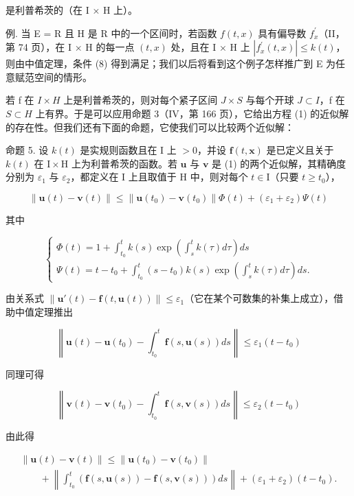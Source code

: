 是利普希茨的（在 I × H 上）。

例. 当 E = R 且 H 是 R 中的一个区间时，若函数 \(f(t, x)\) 具有偏导数 \(f_{x}^{\prime}\)（II，第 74 页），在 I × H 的每一点 \((t, x)\) 处，且在 I × H 上 \(|f_{x}^{\prime}(t, x)| \leqslant k(t)\)，则由中值定理，条件 (8) 得到满足；我们以后将看到这个例子怎样推广到 E 为任意赋范空间的情形。

若 f 在 \(I \times H\) 上是利普希茨的，则对每个紧子区间 \(J \times S\) 与每个开球 \(J \subset I\)，f 在 \(S \subset H\) 上有界。于是可以应用命题 3（IV，第 166 页），它给出方程 (1) 的近似解的存在性。但我们还有下面的命题，它使我们可以比较两个近似解：

命题 5. 设 \(k(t)\) 是实规则函数且在 I 上 \(>0\)，并设 \(\mathbf{f}(t, \mathbf{x})\) 是已定义且关于 \(k(t)\) 在 \(\mathrm{I} \times \mathrm{H}\) 上为利普希茨的函数。若 \(\mathbf{u}\) 与 \(\mathbf{v}\) 是 (1) 的两个近似解，其精确度分别为 \(\varepsilon_1\) 与 \(\varepsilon_2\)，都定义在 I 上且取值于 H 中，则对每个 \(t \in \mathrm{I}\)（只要 \(t \geqslant t_0\)），

\[
\left\| \mathbf {u} (t) - \mathbf {v} (t) \right\| \leqslant \left\| \mathbf {u} \left(t _ {0}\right) - \mathbf {v} \left(t _ {0}\right) \right\| \Phi (t) + \left(\varepsilon_ {1} + \varepsilon_ {2}\right) \Psi (t)\tag{9}
\]

其中

\[
\left\{ \begin{array}{l} \Phi (t) = 1 + \int_ {t _ {0}} ^ {t} k (s) \exp \left(\int_ {s} ^ {t} k (\tau) d \tau\right) d s \\ \Psi (t) = t - t _ {0} + \int_ {t _ {0}} ^ {t} (s - t _ {0}) k (s) \exp \left(\int_ {s} ^ {t} k (\tau) d \tau\right) d s. \end{array} \right.\tag{10}
\]

由关系式 \(\left\| \mathbf{u}'(t) - \mathbf{f}(t, \mathbf{u}(t)) \right\| \leqslant \varepsilon_1\)（它在某个可数集的补集上成立），借助中值定理推出

\[
\left\| \mathbf {u} (t) - \mathbf {u} (t _ {0}) - \int_ {t _ {0}} ^ {t} \mathbf {f} (s, \mathbf {u} (s)) d s \right\| \leqslant \varepsilon_ {1} (t - t _ {0})
\]

同理可得

\[
\left\| \mathbf {v} (t) - \mathbf {v} (t _ {0}) - \int_ {t _ {0}} ^ {t} \mathbf {f} (s, \mathbf {v} (s)) d s \right\| \leqslant \varepsilon_ {2} (t - t _ {0})
\]

由此得

\[
\begin{array}{l} \| \mathbf {u} (t) - \mathbf {v} (t) \| \leqslant \| \mathbf {u} (t _ {0}) - \mathbf {v} (t _ {0}) \| \\ \qquad + \left\| \int_ {t _ {0}} ^ {t} (\mathbf {f} (s, \mathbf {u} (s)) - \mathbf {f} (s, \mathbf {v} (s))) d s \right\| + (\varepsilon_ {1} + \varepsilon_ {2}) (t - t _ {0}). \end{array}
\]

